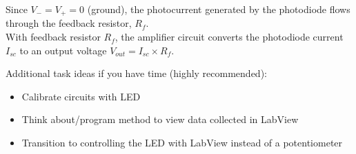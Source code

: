 \documentclass{article}
\begin{document}
\begin{enumerate}
		Since $V_- = V_+ = 0$ (ground), the photocurrent generated by the photodiode flows through the feedback resistor, $R_f$.\\
		
		With feedback resistor $R_f$, the amplifier circuit converts the photodiode current $I_{sc}$ to an output voltage $V_{out} = I_{sc} \times R_f$.	
\end{enumerate}

\begin{info}
	Additional task ideas if you have time (highly recommended):
	\begin{itemize}
		\item Calibrate circuits with LED
		\item Think about/program method to view data collected in LabView
		\item Transition to controlling the LED with LabView instead of a potentiometer
	\end{itemize}
\end{info}
\end{document}
